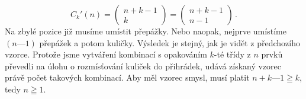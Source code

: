 \begin{example}
  \begin{equation}\label{MAI:eq011}
  \boxed{C_k'(n) =  
    \begin{pmatrix}
        n + k - 1 \\
        k
    \end{pmatrix} = 
    \begin{pmatrix}
        n + k - 1 \\
        n-1
    \end{pmatrix}
    }\, .
  \end{equation}
  Na zbylé pozice již musíme umístit přepážky. Nebo naopak, nejprve umístíme \((n — 1)\) přepážek a 
  potom kuličky. Výsledek je stejný, jak je vidět z předchozího vzorce. Protože jsme vytváření 
  kombinací s opakováním \(k\)-té třídy z \(n\) prvků převedli na úlohu o rozmísťování kuliček do 
  přihrádek, udává získaný vzorec právě počet takových kombinací. Aby měl vzorec smysl, musí platit 
  \(n + k — 1 \geqq k\), tedy \(n \geqq 1\).
  
\end{example}